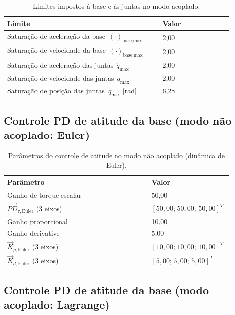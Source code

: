 \begin{table}[H]
\centering
\caption{Limites impostos à base e às juntas no modo acoplado.}
\label{tab:apC_saturacoes_lagrange}
\begin{tabular}{|p{0.62\linewidth}|p{0.28\linewidth}|}
\hline
\textbf{Limite} & \textbf{Valor}\\
\hline
Saturação de aceleração da base $\,\ddot{(\cdot)}_{\text{base,max}}$ & 2,00\\
\hline
Saturação de velocidade da base $\,\dot{(\cdot)}_{\text{base,max}}$ & 2,00\\
\hline
Saturação de aceleração das juntas $\,\ddot{q}_{\max}$ & 2,00\\
\hline
Saturação de velocidade das juntas $\,\dot{q}_{\max}$ & 2,00\\
\hline
Saturação de posição das juntas $\,q_{\max}$ [rad] & 6,28\\
\hline
\end{tabular}
\end{table}

\subsection{Controle PD de atitude da base (modo não acoplado: Euler)}
\label{apC:pd_euler}

\begin{table}[H]
\centering
\caption{Parâmetros do controle de atitude no modo não acoplado (dinâmica de Euler).}
\label{tab:apC_pd_euler}
\begin{tabular}{|p{0.62\linewidth}|p{0.28\linewidth}|}
\hline
\textbf{Parâmetro} & \textbf{Valor}\\
\hline
Ganho de torque escalar & 50,00\\
\hline
$\vec{PD}_{\tau,\text{Euler}}$ (3 eixos) & $[50,00;\,50,00;\,50,00]^T$\\
\hline
Ganho proporcional & 10,00\\
\hline
Ganho derivativo & 5,00\\
\hline
$\vec{K}_{p,\text{Euler}}$ (3 eixos) & $[10,00;\,10,00;\,10,00]^T$\\
\hline
$\vec{K}_{d,\text{Euler}}$ (3 eixos) & $[5,00;\,5,00;\,5,00]^T$\\
\hline
\end{tabular}
\end{table}

\subsection{Controle PD de atitude da base (modo acoplado: Lagrange)}
\label{apC:pd_lagrange}

